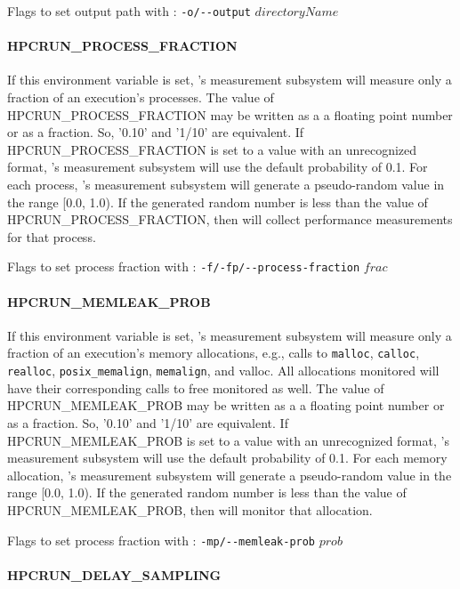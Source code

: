 \parg
Flags to set output path with \hpcrun: \verb|-o/--output| $directoryName$

\paragraph{HPCRUN\_PROCESS\_FRACTION}
\sloppy
If this environment variable is set, \HPCToolkit's measurement
subsystem will measure only a fraction of an execution’s processes.
The value of HPCRUN\_PROCESS\_FRACTION may be written as a a floating
point number or as a fraction.  So, '0.10' and '1/10' are equivalent.
If HPCRUN\_PROCESS\_FRACTION is set to a value with an unrecognized
format, \HPCToolkit's measurement subsystem will use the default
probability of 0.1. For each process, \HPCToolkit's measurement
subsystem will generate a pseudo-random value in the range [0.0, 1.0).
If the generated random number is less than the value of
HPCRUN\_PROCESS\_FRACTION, then \HPCToolkit{} will collect performance
measurements for that process.

\parg
Flags to set process fraction with \hpcrun: \verb|-f/-fp/--process-fraction| $frac$

\paragraph{HPCRUN\_MEMLEAK\_PROB}

If this environment variable is set, \HPCToolkit's measurement
subsystem will measure only a fraction of an execution’s memory
allocations, e.g., calls to \verb|malloc|, \verb|calloc|, \verb|realloc|,
\verb|posix_memalign|, \verb|memalign|, and valloc. All allocations
monitored will have their corresponding calls to free monitored as
well. The value of HPCRUN\_MEMLEAK\_PROB may be written as a a
floating point number or as a fraction.  So, '0.10' and '1/10' are
equivalent. If HPCRUN\_MEMLEAK\_PROB is set to a value with an
unrecognized format, \HPCToolkit's measurement subsystem will use the
default probability of 0.1. For each memory allocation, \HPCToolkit's
measurement subsystem will generate a pseudo-random value in the range
[0.0, 1.0). If the generated random number is less than the value
of HPCRUN\_MEMLEAK\_PROB, then \HPCToolkit{} will monitor that
allocation.

\parg
Flags to set process fraction with \hpcrun: \verb|-mp/--memleak-prob| $prob$

\paragraph{HPCRUN\_DELAY\_SAMPLING}

